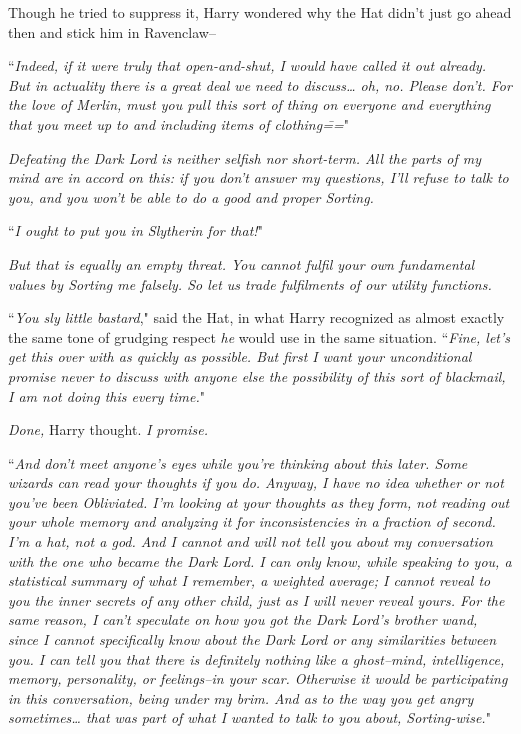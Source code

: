 Though he tried to suppress it, Harry wondered why the Hat didn't just go ahead then and stick him in Ravenclaw\---

``\emph{Indeed, if it were truly that open-and-shut, I would have called it out already. But in actuality there is a great deal we need to discuss{\ldots} oh, no. Please don't. For the love of Merlin, \emph{must} you pull this sort of thing on everyone and everything that you meet up to and including items of clothing\===}"

\emph{Defeating the Dark Lord is neither selfish nor short-term. All the parts of my mind are in accord on this: if you don't answer my questions, I'll refuse to talk to you, and you won't be able to do a good and proper Sorting.}

``\emph{I ought to put you in Slytherin for that!}"

\emph{But that is \emph{equally} an empty threat. You cannot fulfil your own fundamental values by Sorting me falsely. So let us trade fulfilments of our utility functions.}

``\emph{You sly little bastard}," said the Hat, in what Harry recognized as almost exactly the same tone of grudging respect \emph{he} would use in the same situation. ``\emph{Fine, let's get this over with as quickly as possible. But first I want your unconditional promise never to discuss with anyone else the possibility of this sort of blackmail, I am \emph{not} doing this every time.}"

\emph{Done,} Harry thought. \emph{I promise.}

``\emph{And don't meet anyone's eyes while you're thinking about this later. Some wizards can read your thoughts if you do. Anyway, I have no idea whether or not you've been Obliviated. I'm looking at your thoughts as they form, not reading out your whole memory and analyzing it for inconsistencies in a fraction of second. I'm a hat, not a god. And I cannot and will not tell you about my conversation with the one who became the Dark Lord. I can only \emph{know}, while speaking to you, a statistical summary of what I remember, a weighted average; I \emph{cannot} reveal to you the inner secrets of any other child, just as I will never reveal yours. For the same reason, I can't speculate on how you got the Dark Lord's brother wand, since I cannot specifically know about the Dark Lord or any similarities between you. I \emph{can} tell you that there is definitely nothing like a ghost\---mind, intelligence, memory, personality, or feelings\---in your scar. Otherwise it would be participating in this conversation, being under my brim. And as to the way you get angry sometimes{\ldots} that was part of what I wanted to talk to you about, Sorting-wise.}"

